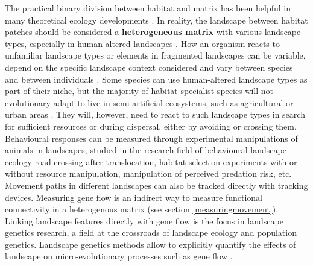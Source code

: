 \documentclass[10pt, twoside]{book} %
\begin{document}
	The practical binary division between habitat and matrix has been helpful in many theoretical ecology developments \citep{macarthur1967, hanski1998}. In reality, the landscape between habitat patches should be considered a \textbf{heterogeneous matrix} with various landscape types, especially in human-altered landscapes \citep{driscoll2013, manel2013}. How an organism reacts to unfamiliar landscape types or elements in fragmented landscapes can be variable, depend on the specific landscape context considered and vary between species and between individuals \citep{baguette2007, knowlton2010}. Some species can use human-altered landscape types as part of their niche, but the majority of habitat specialist species will not evolutionary adapt to live in semi-artificial ecosystems, such as agricultural or urban areas \citep{moller2009, mcdonnell2015, kimmig2020}. They will, however, need to react to such landscape types in search for sufficient resources or during dispersal, either by avoiding or crossing them. Behavioural responses can be measured through experimental manipulations of animals in landscapes, studied in the research field of behavioural landscape ecology \citep{knowlton2010} road-crossing after translocation, habitat selection experiments with or without resource manipulation, manipulation of perceived predation risk, etc. Movement paths in different landscapes can also be tracked directly with tracking devices. Measuring gene flow is an indirect way to measure functional connectivity in a heterogenous matrix (see section \ref{measuringmovement}). Linking landscape features directly with gene flow is the focus in landscape genetics research, a field at the crossroads of landscape ecology and population genetics. Landscape genetics methods allow to explicitly quantify the effects of landscape on micro-evolutionary processes such as gene flow \citep{manel2003, manel2013, balkenhol2015}.\\
	
\end{document}
